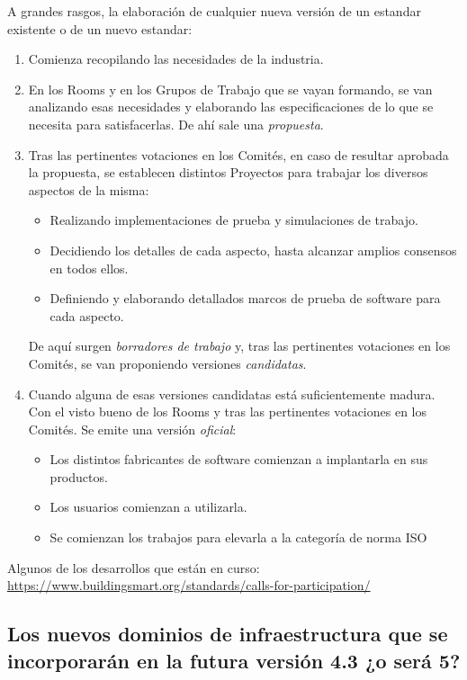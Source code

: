 \documentclass[spanish,10pt,a4paper,final,oneside]{article}
\begin{document}
A grandes rasgos, la elaboración de cualquier nueva versión de un estandar existente o de un nuevo estandar:
\begin{enumerate}
\item Comienza recopilando las necesidades de la industria.

\item En los Rooms y en los Grupos de Trabajo que se vayan formando, se van analizando esas necesidades y elaborando las especificaciones de lo que se necesita para satisfacerlas. De ahí sale una \textit{propuesta}.

\item Tras las pertinentes votaciones en los Comités, en caso de resultar aprobada la propuesta, se establecen distintos Proyectos para trabajar los diversos aspectos de la misma:
\begin{itemize}
\item Realizando implementaciones de prueba y simulaciones de trabajo.
\item Decidiendo los detalles de cada aspecto, hasta alcanzar amplios consensos en todos ellos.
\item Definiendo y elaborando detallados marcos de prueba de software para cada aspecto.
\end{itemize} 
De aquí surgen \textit{borradores de trabajo} y, tras las pertinentes votaciones en los Comités, se van proponiendo versiones \textit{candidatas}.

\item Cuando alguna de esas versiones candidatas está suficientemente madura. Con el visto bueno de los Rooms y tras las pertinentes votaciones en los Comités. Se emite una versión \textit{oficial}:
\begin{itemize}
\item Los distintos fabricantes de software comienzan a implantarla en sus productos.
\item Los usuarios comienzan a utilizarla.
\item Se comienzan los trabajos para elevarla a la categoría de norma ISO
\end{itemize}
\end{enumerate}

\vspace{1cm}
Algunos de los desarrollos que están en curso: \url{https://www.buildingsmart.org/standards/calls-for-participation/}

\subsection{Los nuevos dominios de infraestructura que se incorporarán en la futura versión 4.3 ¿o será 5?}
\end{document}
